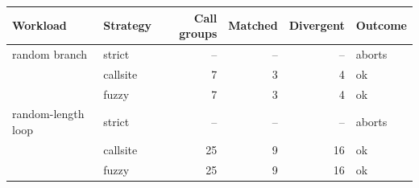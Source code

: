 \begin{tabular}{llrrrl}
\toprule
Workload & Strategy & Call groups & Matched & Divergent & Outcome \\
\midrule
random branch & strict & -- & -- & -- & aborts \\
 & callsite & 7 & 3 & 4 & ok \\
 & fuzzy & 7 & 3 & 4 & ok \\
random-length loop & strict & -- & -- & -- & aborts \\
 & callsite & 25 & 9 & 16 & ok \\
 & fuzzy & 25 & 9 & 16 & ok \\
\bottomrule
\end{tabular}

